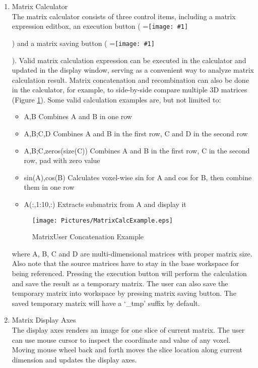 \documentclass{article}%
\newcommand{\vcenteredinclude}[1]{
\begingroup
\setbox0=\hbox{\texttt{[image: \#1]}}
\parbox{\wd0}{\box0}\endgroup}
\begin{document}
\begin{enumerate}
	\item Matrix Calculator \\
	
The matrix calculator consists of three control items, including a matrix expression editbox, an execution button (\vcenteredinclude{Pictures/MatrixCalc.eps}) and a matrix saving button (\vcenteredinclude{Pictures/Upload.eps}). Valid matrix calculation expression can be executed in the calculator and updated in the display window, serving as a convenient way to analyze matrix calculation result. Matrix concatenation and recombination can also be done in the calculator, for example, to side-by-side compare multiple 3D matrices (Figure \ref{fig:MatrixCalcExample}). Some valid calculation examples are, but not limited to:
	\begin{itemize}
		\item A,B Combines A and B in one row
		\item A,B;C,D Combines A and B in the first row, C and D in the second row
		\item A,B;C,zeros(size(C)) Combines A and B in the first row, C in the second row, pad with zero value
		\item sin(A),cos(B) Calculates voxel-wise sin for A and cos for B, then combine them in one row
		\item A(:,1:10,:) Extracts submatrix from A and display it
	\end{itemize}
	
\begin{figure}[htbp]
	\centering
		\texttt{[image: Pictures/MatrixCalcExample.eps]}
	\caption{MatrixUser Concatenation Example}
	\label{fig:MatrixCalcExample}
\end{figure}
	
where A, B, C and D are multi-dimensional matrices with proper matrix size. Also note that the source matrices have to stay in the base workspace for being referenced. Pressing the execution button will perform the calculation and save the result as a temporary matrix. The user can also save the temporary matrix into workspace by pressing matrix saving button. The saved temporary matrix will have a `\_tmp' suffix by default.
	
	\item Matrix Display Axes \\
	
The display axes renders an image for one slice of current matrix. The user can use mouse cursor to inspect the coordinate and value of any voxel. Moving mouse wheel back and forth moves the slice location along current dimension and updates the display axes.
	

\end{enumerate}
\end{document}
